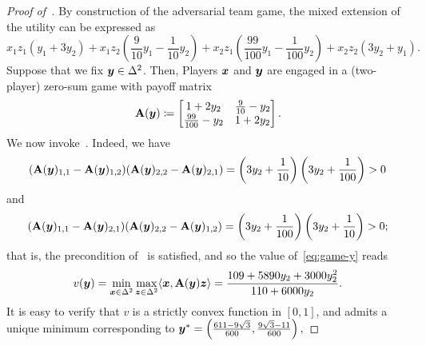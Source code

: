 \begin{proof}[Proof of~]
    By construction of the adversarial team game, the mixed extension of the utility can be expressed as
    \begin{equation*}
        x_1 z_1 \left( y_1 + 3 y_2 \right) + x_1 z_2 \left( \frac{9}{10} y_1 - \frac{1}{10} y_2 \right) + x_2 z_1 \left( \frac{99}{100} y_1 - \frac{1}{100} y_2 \right) + x_2 z_2 \left( 3y_2 + y_1 \right).
    \end{equation*}
    Suppose that we fix ${\bm{y}} \in \Delta^2$. Then, Players ${\bm{x}}$ and ${\bm{y}}$ are engaged in a (two-player) zero-sum game with payoff matrix
    \begin{equation}
        \label{eq:game-y}
    \mathbf{A}({\bm{y}}) \coloneqq 
        \begin{bmatrix}
        1 + 2y_2 & \frac{9}{10} - y_2 \\
        \frac{99}{100} - y_2 & 1 + 2 y_2
    \end{bmatrix}.
    \end{equation}
    We now invoke~. Indeed, we have
    \begin{equation}
        \label{eq:diag-pos1}
        (\mathbf{A}({\bm{y}})_{1,1} - \mathbf{A}({\bm{y}})_{1, 2}) (\mathbf{A}({\bm{y}})_{2, 2} - \mathbf{A}({\bm{y}})_{2, 1}) = \left( 3 y_2 + \frac{1}{10} \right) \left( 3 y_2 + \frac{1}{100} \right) > 0
    \end{equation}
    and
    \begin{equation}
        \label{eq:diag-pos2}
        (\mathbf{A}({\bm{y}})_{1,1} - \mathbf{A}({\bm{y}})_{2, 1}) (\mathbf{A}({\bm{y}})_{2, 2} - \mathbf{A}({\bm{y}})_{1, 2}) = \left( 3 y_2 + \frac{1}{100} \right) \left( 3 y_2 + \frac{1}{10} \right) > 0;
    \end{equation}
    that is, the precondition of~ is satisfied, and so the value of~\eqref{eq:game-y} reads
    \begin{equation}
        \label{eq:value}
        v({\bm{y}}) = \min_{{\bm{x}} \in \Delta^2} \max_{{\bm{z}} \in \Delta^2} \langle {\bm{x}}, \mathbf{A}({\bm{y}}) {\bm{z}} \rangle = \frac{109 + 5890 y_2 + 3000 y_2^2}{110 + 6000y_2}.
    \end{equation}
    It is easy to verify that $v$ is a strictly convex function in $[0, 1]$, and admits a unique minimum corresponding to
    $
        \vy^* = 
        \left(\frac{611 - 9 \sqrt{3}}{600},
            \frac{9\sqrt{3} - 11}{600}\right),%
    $

\end{proof}

